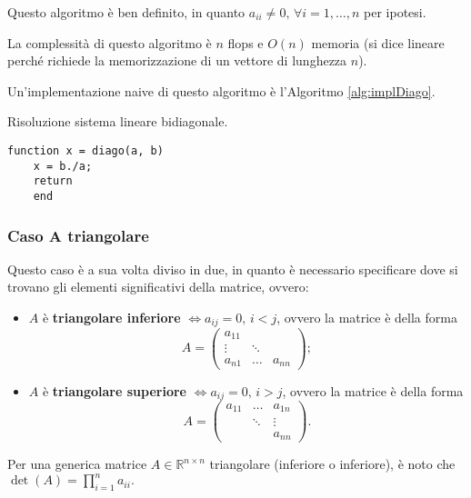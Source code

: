 Questo algoritmo è ben definito, in quanto $a_{ii}\neq 0,\, \forall i=1,\hdots,n$ per ipotesi. 

La complessità di questo algoritmo è $n$ flops e $O(n)$ memoria (si dice lineare perché richiede la memorizzazione di un vettore di lunghezza $n$).

Un'implementazione naive di questo algoritmo è l'Algoritmo \ref{alg:implDiago}.

\begin{algorithm}\caption{Risoluzione sistema lineare bidiagonale.}\label{alg:implDiago}
    \begin{lstlisting}[style=Matlab-editor]
    function x = diago(a, b)
    x = b./a;
    return
    end
    \end{lstlisting}
\end{algorithm} 

\subsubsection{Caso \texorpdfstring{$\boldsymbol A$}{A} triangolare}
Questo caso è a sua volta diviso in due, in quanto è necessario specificare dove si trovano gli elementi significativi della matrice, ovvero:
\begin{itemize}
    \item $A$ è \textbf{triangolare inferiore} $\iff a_{ij}=0,\, i<j$, ovvero la matrice è della forma 
        \begin{equation*}
            A=
            \begin{pmatrix}
                a_{11} & & \\
                \vdots & \ddots & \\
                a_{n1} & \hdots & a_{nn}
            \end{pmatrix};
    \end{equation*}
    \item $A$ è \textbf{triangolare superiore} $\iff a_{ij}=0,\, i>j$, ovvero la matrice è della forma
    \begin{equation*}
        A=
        \begin{pmatrix}
            a_{11} & \hdots & a_{1n}\\
                &\ddots & \vdots\\
             & & a_{nn}
        \end{pmatrix}.
    \end{equation*}
\end{itemize}

\noindent Per una generica matrice $A\in\mathbb R^{n\times n}$ triangolare (inferiore o inferiore), è noto che $\det(A)=\prod_{i=1}^n a_{ii}.$

